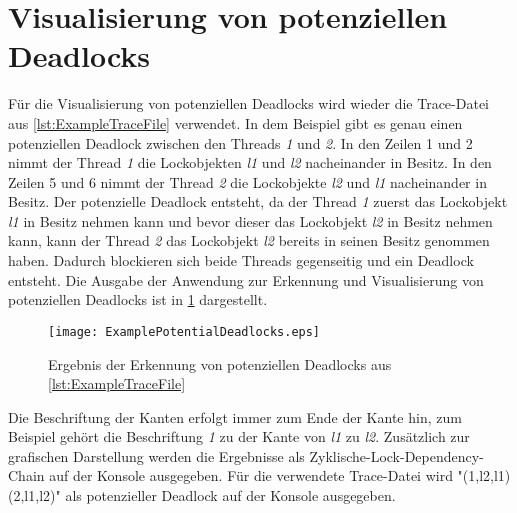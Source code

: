 \section{Visualisierung von potenziellen Deadlocks}
\label{section:DeadlockVisualization}
Für die Visualisierung von potenziellen Deadlocks wird wieder die Trace-Datei
aus \cref{lst:ExampleTraceFile} verwendet. In dem Beispiel gibt es genau einen
potenziellen Deadlock zwischen den Threads \textit{1} und \textit{2}. In den
Zeilen 1 und 2 nimmt der Thread \textit{1} die Lockobjekten \textit{l1} und
\textit{l2} nacheinander in Besitz. In den Zeilen 5 und 6 nimmt der Thread
\textit{2} die Lockobjekte \textit{l2} und \textit{l1} nacheinander in Besitz.
Der potenzielle Deadlock entsteht, da der Thread \textit{1} zuerst das
Lockobjekt \textit{l1} in Besitz nehmen kann und bevor dieser das Lockobjekt
\textit{l2} in Besitz nehmen kann, kann der Thread \textit{2} das Lockobjekt
\textit{l2} bereits in seinen Besitz genommen haben. Dadurch blockieren sich
beide Threads gegenseitig und ein Deadlock entsteht. Die Ausgabe der Anwendung
zur Erkennung und Visualisierung von potenziellen Deadlocks ist in
\cref{fig:DeadlockVisualization} dargestellt.
\begin{figure}[ht]
  \texttt{[image: ExamplePotentialDeadlocks.eps]}
  \caption{Ergebnis der Erkennung von potenziellen Deadlocks aus \cref{lst:ExampleTraceFile}}
  \label{fig:DeadlockVisualization}
\end{figure}
Die Beschriftung der Kanten erfolgt immer zum Ende der Kante hin, zum Beispiel
gehört die Beschriftung \textit{1} zu der Kante von \textit{l1} zu \textit{l2}.
Zusätzlich zur grafischen Darstellung werden die Ergebnisse als
Zyklische-Lock-Dependency-Chain auf der Konsole ausgegeben. Für die verwendete
Trace-Datei wird "(1,l2,{l1}) (2,l1,{l2})" als potenzieller Deadlock auf der
Konsole ausgegeben.